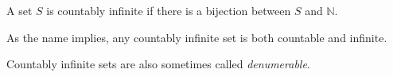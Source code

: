 \documentclass[12pt]{article}
\begin{document}
A set $S$ is countably infinite if there is a bijection between $S$ and $\mathbb{N}$.

As the name implies, any countably infinite set is both countable and infinite.

Countably infinite sets are also sometimes called \emph{denumerable}.
\end{document}
